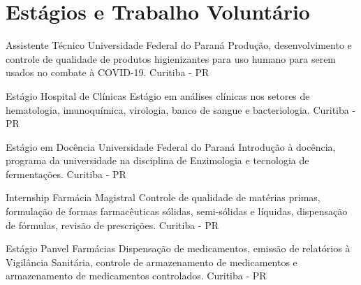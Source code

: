 \section{Estágios e Trabalho Voluntário}

{Assistente Técnico}
{Universidade Federal do Paraná}
{
Produção, desenvolvimento e controle de qualidade de produtos higienizantes 
para uso humano para serem usados no combate à COVID-19.
}
{Curitiba - PR}

{Estágio}
{Hospital de Clínicas}
{
Estágio em análises clínicas nos setores de hematologia, 
imunoquímica, virologia, banco de sangue e bacteriologia.
}
{Curitiba - PR}

{Estágio em Docência}
{Universidade Federal do Paraná}
{
Introdução à docência, programa da universidade 
na disciplina de Enzimologia e tecnologia de fermentações.
}
{Curitiba - PR}

{Internship}
{Farmácia Magistral}
{
Controle de qualidade de matérias primas, 
formulação de formas farmacêuticas sólidas, 
semi-sólidas e líquidas, dispensação de fórmulas, 
revisão de prescrições.
}
{Curitiba - PR}

{Estágio}
{Panvel Farmácias}
{
Dispensação de medicamentos, 
emissão de relatórios à Vigilância Sanitária, 
controle de armazenamento de medicamentos e 
armazenamento de medicamentos controlados.
}
{Curitiba - PR}